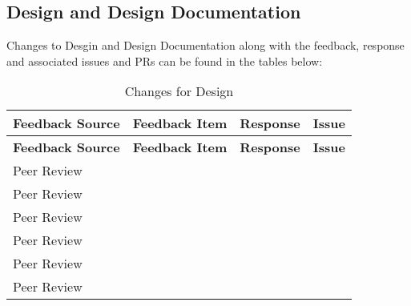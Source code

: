 \documentclass{article}
\begin{document}
\subsection{Design and Design Documentation}

Changes to Desgin and Design Documentation along with the feedback, response and associated issues and PRs can be found in the tables below: 

\begin{longtable}{| p{} | p{} | p{} | p{} |}
    \caption{Changes for Design} \\
    \hline
    \textbf{Feedback Source} & \textbf{Feedback Item} & \textbf{Response} & \textbf{Issue} \\
    \hline
    \endfirsthead
    \hline
    \textbf{Feedback Source} & \textbf{Feedback Item} & \textbf{Response} & \textbf{Issue} \\
    \hline
    \endhead
    \hline
    \endfoot
    Peer Review&  &  & \href{}{} \\
    \hline
    Peer Review&  &  & \href{}{} \\
    \hline
    Peer Review&  &  & \href{}{} \\
    \hline
    Peer Review&  &  & \href{}{} \\
    \hline
    Peer Review&  &  & \href{}{} \\
    \hline
    Peer Review&  &  & \href{}{} \\
    \hline
\end{longtable}
\end{document}
